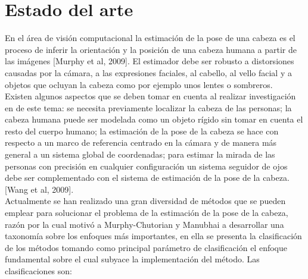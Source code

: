 \chapter{Estado del arte}

   En el área de visión computacional la estimación de la pose de una cabeza es el proceso de inferir la orientación y la posición de una cabeza humana a partir de las imágenes [Murphy et al, 2009]. El estimador debe ser robusto a distorsiones causadas por la cámara, a las expresiones faciales, al cabello, al vello facial y a objetos que ocluyan la cabeza como por ejemplo unos lentes o sombreros.\\
   Existen algunos aspectos que se deben tomar en cuenta al realizar investigación en de este tema: se necesita previamente localizar la cabeza de las personas; la cabeza humana puede ser modelada como un objeto rígido sin tomar en cuenta el resto del cuerpo humano; la estimación de la pose de la  cabeza se hace con respecto a un marco de referencia centrado en la cámara y de manera más general a un sistema global de coordenadas; para estimar la mirada de las personas con precisión en cualquier configuración un sistema seguidor de ojos debe ser complementado con el sistema de estimación de la  pose de la cabeza. [Wang et al, 2009].\\
   Actualmente se han realizado  una gran diversidad de métodos que se pueden emplear para solucionar el problema de la estimación de la pose de la cabeza, razón por la cual motivó a Murphy-Chutorian y Manubhai a desarrollar una taxonomía sobre los enfoques más importantes, en ella se presenta la clasificación de los métodos tomando como principal parámetro de clasificación el enfoque fundamental sobre el cual subyace la implementación del método. Las clasificaciones son:
